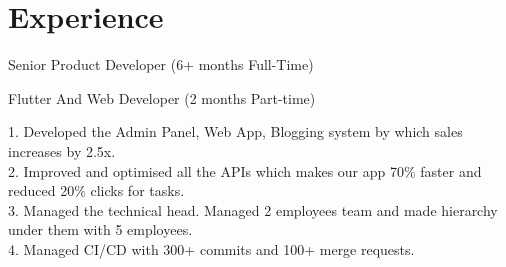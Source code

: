 \documentclass[]{deedy-resume-openfont}
\begin{document}
\hfill
\begin{minipage}[t]{0.55\textwidth} 


\section{Experience}
\vspace{\topsep}
\vspace{\topsep}

\begin{tightemize}
\item Senior Product Developer (6+ months Full-Time)
\end{tightemize}
\hspace{\topsep}

\begin{tightemize}
\item Flutter And Web Developer (2 months Part-time)
\end{tightemize}
\hspace{\topsep}

\vspace{\topsep} %
\hspace{\topsep}1. Developed the Admin Panel, Web App, Blogging system by which sales increases by 2.5x.\\
\hspace{\topsep}2. Improved and optimised all the APIs which makes our app 70\% faster and reduced 20\% clicks for tasks.\\
\hspace{\topsep}3. Managed the technical head. Managed 2 employees team and made hierarchy under them with 5 employees.\\
\hspace{\topsep}4. Managed CI/CD with 300+ commits and 100+ merge requests.
\sectionsep

\sectionsep




\end{minipage}
\end{document}
